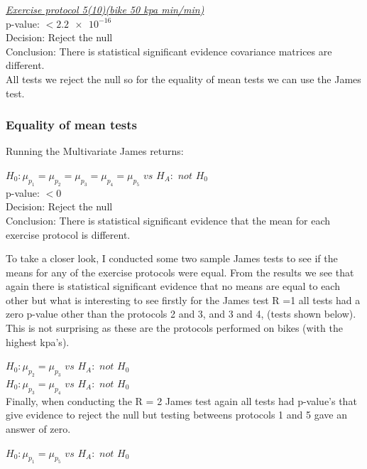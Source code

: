\documentclass[a4paper]{article}
\begin{document}
\newpage  

\underline{\textit{Exercise protocol 5(10)(bike 50
kpa min/min)}}\\
p-value: $< \num{2.2e-16}$\\
Decision: Reject the null\\
Conclusion: There is statistical significant evidence covariance matrices 
are different.\\

All tests we reject the null so for the equality of mean tests we can use the James test.

\subsubsection{Equality of mean tests}

Running the Multivariate James returns:

$H_0 : \mu_{p_1} = \mu_{p_2} = \mu_{p_3} = \mu_{p_4}  = \mu_{p_5}$ $vs$ $H_A :$ $not$ $H_0$\\
p-value: $< \num{0}$\\
Decision: Reject the null\\
Conclusion: There is statistical significant evidence that the mean for each exercise protocol is different.\\
\newpage

To take a closer look, I conducted some two sample James tests to see if the means for any of the exercise protocols were equal. 
From the results we see that again there is statistical significant evidence that no means are equal to each other but what is interesting to see firstly for the James test R =1 all tests had a zero p-value other than the protocols 2 and 3, and 3 and 4, (tests shown below). This is not surprising as these are the protocols performed on bikes (with the highest kpa's). 

$H_0 : \mu_{p_2} = \mu_{p_3}$ $vs$ $H_A :$ $not$ $H_0$\\



$H_0 : \mu_{p_3} = \mu_{p_4}$ $vs$ $H_A :$ $not$ $H_0$\\

Finally, when conducting the R = 2 James test again all tests had p-value's that give evidence to reject the null but testing betweens protocols 1 and 5 gave an answer of zero.

$H_0 : \mu_{p_1} = \mu_{p_5}$ $vs$ $H_A :$ $not$ $H_0$\\
\end{document}
